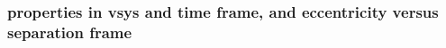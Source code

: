 \documentclass[twocolumn]{aastex63}
\begin{document}

\subsubsection{properties in vsys and time frame, and eccentricity versus separation frame }
%
\end{document}
